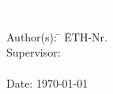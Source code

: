 %
%
%
%


\begin{titlepage}


{
\vspace{5mm}
{\Huge\textcolor{white}{Bachelor Arbeit}}\\[2mm]
{\Huge\textcolor{white}{\textbf{\mytitle}}}

{\color{white} 
\begin{tabbing}
Author(s): \hspace{20mm} \= \myauthor \hspace{20mm} \= ETH-Nr. \myethnr \\[3mm]
Supervisor: \> \myprofessor\\[1mm]
\> \mysupervisor\\[3mm]
Date: \> \today
\end{tabbing}
}
}
\vspace{7mm}
\begin{figure}[ht!]
  \centering
  
\end{figure}




\end{titlepage}


%

